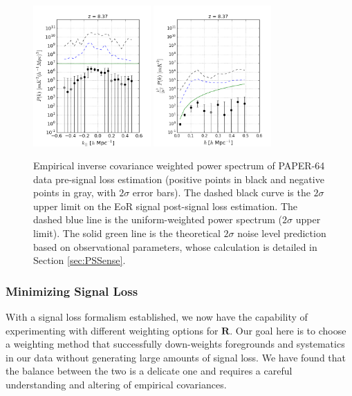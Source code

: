 \documentclass[preprint2,numberedappendix,tighten]{aastex6}  %
\begin{document}
\begin{figure}
	\centering
	\includegraphics[width=0.4\textwidth]{plots/ps1_data.png}
	\includegraphics[width=0.4\textwidth]{plots/ps2_data.png}
	\caption{Empirical inverse covariance weighted power spectrum of PAPER-64 data pre-signal loss estimation (positive points in black and negative points in gray, 
with $2\sigma$ error bars). The dashed black curve is the $2\sigma$ upper limit on the EoR signal post-signal loss estimation. The dashed blue line is the uniform-weighted power 
spectrum ($2\sigma$ upper limit). The solid green line is the theoretical $2\sigma$ noise level prediction based on observational 
parameters, whose calculation is detailed in Section \ref{sec:PSSense}.}
	\label{fig:ps2_data}
\end{figure}


\subsubsection{Minimizing Signal Loss}
\label{sec:Weight}

With a signal loss formalism established, we now have the capability of experimenting 
with different weighting options for $\textbf{R}$. Our goal here is to choose a weighting method that successfully down-weights 
foregrounds and systematics in our data without generating large amounts of signal loss. We have found that the balance 
between the two is a delicate one and requires a careful understanding and altering of empirical covariances. 
\end{document}
